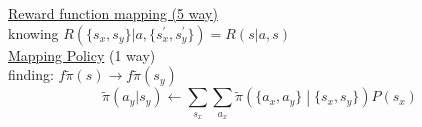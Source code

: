 

\underline{Reward function mapping (5 way)}\\

knowing $R\left(\{s_x, s_y\}|a, \{s^\prime_x,s^\prime_y\}\right)=R(s|a,s)$\\




\underline{Mapping Policy} (1 way)\\

finding: $f\tilde{\pi}(s)\to f\tilde{\pi}(s_y)$\\

\begin{equation*}
\tilde{\pi}(a_y|s_y) \leftarrow \sum_{s_x}\sum_{a_x}\tilde{\pi}\left( \{ a_x, a_y \} \middle|  \{ s_x, s_y \} \right)P(s_x) 
\end{equation*}